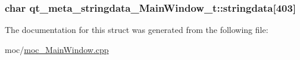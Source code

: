 \subsubsection[{stringdata}]{\setlength{\rightskip}{0pt plus 5cm}char qt\+\_\+meta\+\_\+stringdata\+\_\+\+Main\+Window\+\_\+t\+::stringdata\mbox{[}403\mbox{]}}\label{structqt__meta__stringdata__MainWindow__t_a6b033614233f7db3c4ec3324718af6ec}


The documentation for this struct was generated from the following file\+:\begin{DoxyCompactItemize}
\item 
moc/\hyperlink{moc__MainWindow_8cpp}{moc\+\_\+\+Main\+Window.\+cpp}\end{DoxyCompactItemize}
